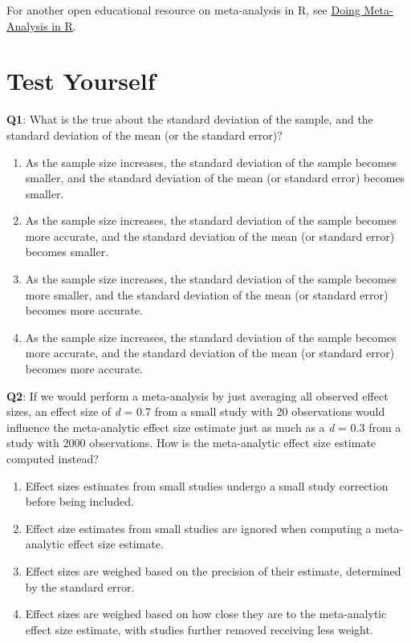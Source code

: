 \documentclass[
  oneside]{book}
\providecommand{\tightlist}{%
  \setlength{\itemsep}{0pt}\setlength{\parskip}{0pt}}
\begin{document}
For another open educational resource on meta-analysis in R, see \href{https://bookdown.org/MathiasHarrer/Doing_Meta_Analysis_in_R}{Doing Meta-Analysis in R}.

\hypertarget{test-yourself-9}{%
\section{Test Yourself}\label{test-yourself-9}}

\textbf{Q1}: What is the true about the standard deviation of the sample, and the standard deviation of the mean (or the standard error)?

\begin{enumerate}
\def\labelenumi{\Alph{enumi})}
\tightlist
\item
  As the sample size increases, the standard deviation of the sample becomes smaller, and the standard deviation of the mean (or standard error) becomes smaller.
\item
  As the sample size increases, the standard deviation of the sample becomes more accurate, and the standard deviation of the mean (or standard error) becomes smaller.
\item
  As the sample size increases, the standard deviation of the sample becomes more smaller, and the standard deviation of the mean (or standard error) becomes more accurate.
\item
  As the sample size increases, the standard deviation of the sample becomes more accurate, and the standard deviation of the mean (or standard error) becomes more accurate.
\end{enumerate}

\textbf{Q2}: If we would perform a meta-analysis by just averaging all observed effect sizes, an effect size of \emph{d} = 0.7 from a small study with 20 observations would influence the meta-analytic effect size estimate just as much as a \emph{d} = 0.3 from a study with 2000 observations. How is the meta-analytic effect size estimate computed instead?

\begin{enumerate}
\def\labelenumi{\Alph{enumi})}
\tightlist
\item
  Effect sizes estimates from small studies undergo a small study correction before being included.
\item
  Effect size estimates from small studies are ignored when computing a meta-analytic effect size estimate.
\item
  Effect sizes are weighed based on the precision of their estimate, determined by the standard error.
\item
  Effect sizes are weighed based on how close they are to the meta-analytic effect size estimate, with studies further removed receiving less weight.
\end{enumerate}
\end{document}
